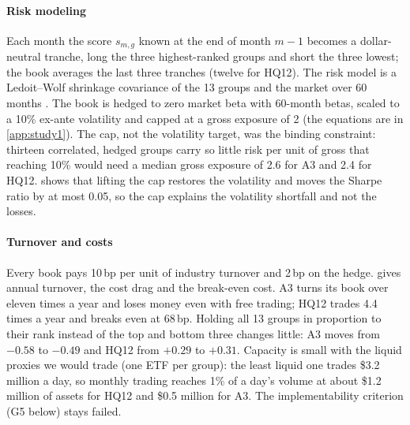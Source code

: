 \paragraph{Risk modeling}\label{par:risk} Each month the score $s_{m,g}$ known at the end of month $m-1$ becomes a dollar-neutral tranche, long the three highest-ranked groups and short the three lowest; the book averages the last three tranches (twelve for HQ12). The risk model is a Ledoit--Wolf shrinkage covariance of the 13 groups and the market over 60 months \citep{LedoitWolf2004}. The book is hedged to zero market beta with 60-month betas, scaled to a 10\% ex-ante volatility and capped at a gross exposure of 2 (the equations are in \cref{app:study1}). The cap, not the volatility target, was the binding constraint: thirteen correlated, hedged groups carry so little risk per unit of gross that reaching 10\% would need a median gross exposure of 2.6 for A3 and 2.4 for HQ12. %
 shows that lifting the cap restores the volatility and moves the Sharpe ratio by at most 0.05, so the cap explains the volatility shortfall and not the losses.

\begin{table}[!htbp]
\centering\footnotesize
\caption{Risk overlay in the test window: A3 and HQ12 with the gross cap at 2 (as run), 3 and none. \hfill\tagp\ (diagnostic)} %
\label{tab:overlay}
\fit{}
\end{table}

\paragraph{Turnover and costs}\label{par:costs} Every book pays 10\,bp per unit of industry turnover and 2\,bp on the hedge.  gives annual turnover, the cost drag and the break-even cost. A3 turns its book over eleven times a year and loses money even with free trading; HQ12 trades 4.4 times a year and breaks even at 68\,bp. %
Holding all 13 groups in proportion to their rank instead of the top and bottom three changes little: A3 moves from $-0.58$ to $-0.49$ and HQ12 from $+0.29$ to $+0.31$. %
Capacity is small with the liquid proxies we would trade (one ETF per group): the least liquid one trades \$3.2 million a day, so monthly trading reaches 1\% of a day's volume at about \$1.2 million of assets for HQ12 and \$0.5 million for A3. The implementability criterion (G5 below) stays failed. %

